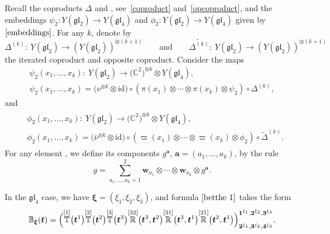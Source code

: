 \documentclass[10pt,a4paper]{amsart}
\numberwithin{equation}{section}
\begin{document}
Recall the coproducts $\Delta$ and \smash{$\widetilde{\Delta}$}, see~\eqref{coproduct} and~\eqref{opcoproduct}, and the embeddings $\psi_2\colon Y(\mathfrak{g l}_{2})\rightarrow Y(\mathfrak{g l}_{4})$ and $\phi_2\colon Y(\mathfrak{g l}_{2})\rightarrow Y(\mathfrak{g l}_{4})$ given by $\eqref{embeddings}$.
For any $k$, denote by
\[
 \Delta^{(k)}\colon \ Y(\mathfrak{g l}_{2}) \rightarrow(Y(\mathfrak{g l}_{2}))^{\otimes(k+1)} \qquad \text{and}\qquad \widetilde{\Delta^{(k)}}\colon \ Y(\mathfrak{g l}_{2}) \rightarrow(Y(\mathfrak{g l}_{2}))^{\otimes(k+1)}
 \]
 the iterated coproduct and opposite coproduct.
Consider the maps
\begin{gather*}\psi_2(x_{1}, \dots, x_{k})\colon\ Y(\mathfrak{g l}_{2}) \rightarrow\bigl(\mathbb{C}^{2}\bigr)^{\otimes k} \otimes Y(\mathfrak{g l}_{4}),
\\
\psi_2(x_{1}, \dots, x_{k})= \bigl(\nu^{\otimes k} \otimes \mathrm{id}\bigr) \circ (\pi (x_{1} ) \otimes \cdots \otimes \pi (x_{k} ) \otimes \psi_2 ) \circ\Delta^{(k)},
\end{gather*}
and
\begin{gather*}
\begin{split}
& \phi_2 (x_{1}, \dots, x_{k} )\colon\ Y(\mathfrak{g l}_{2}) \rightarrow\bigl(\mathbb{C}^{2}\bigr)^{\otimes k} \otimes Y(\mathfrak{g l}_{4}),
\\
& \phi_2 (x_{1}, \dots, x_{k} )= \bigl(\bar{\nu}^{\otimes k} \otimes \mathrm{id} \bigr) \circ ( \varpi (x_{1} ) \otimes \cdots \otimes \varpi (x_{k} ) \otimes \phi_2 ) \circ \widetilde{\Delta} ^{(k)}.
\end{split}
\end{gather*}
For any element , we define its components $g^{\boldsymbol{a}}$, $\boldsymbol{a}=(a_{1}, \dots, a_{k})$, by the rule
\begin{equation*}
g=\sum_{a_{1}, \dots, a_{k}=1}^{2} \mathbf{w}_{a_{1}} \otimes \cdots \otimes \mathbf{w}_{a_{k}} \otimes g^{\boldsymbol{a}}.
\end{equation*}

In the $\mathfrak{gl}_4$ case, we have $\boldsymbol{\xi}=(\xi_1,\xi_2,\xi_3)$, and formula $\eqref{betthe 1}$ takes the form
\begin{eqnarray*}
{\mathbb{B}}_{\boldsymbol{\xi}}(\boldsymbol{t})=\Bigl(\overset{[1]}{\mathbb{T}}\bigl(\boldsymbol{t}^1\bigr)\overset{[2]}{\mathbb{T}}\bigl(\boldsymbol{t}^2\bigr)\overset{[3]}{\mathbb{T}}\bigl(\boldsymbol{t}^3\bigr)
\overset{[32]}{\mathbb{R}}\bigl(\boldsymbol{t}^3,\boldsymbol{t}^2\bigr)\overset{[31]}{\mathbb{R}}\bigl(\boldsymbol{t}^3,\boldsymbol{t}^1\bigr)\overset{[21]}{\mathbb{R}}\bigl(\boldsymbol{t}^2,\boldsymbol{t}^1\bigr)
\Bigr)^{\boldsymbol{1}^{\xi_1}, \boldsymbol{2}^{\xi_2}, \boldsymbol{3}^{\xi_3}}_{\boldsymbol{2}^{\xi_1}, \boldsymbol{3}^{\xi_2}, \boldsymbol{4}^{\xi_3}}.
\end{eqnarray*}
\end{document}
